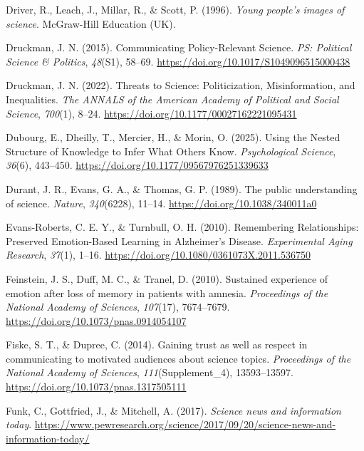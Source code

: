 \documentclass[
  man,
  floatsintext,
  longtable,
  nolmodern,
  notxfonts,
  notimes,
  colorlinks=true,linkcolor=blue,citecolor=blue,urlcolor=blue]{apa7}
\newlength{\cslhangindent}
\newenvironment{CSLReferences}[2] %
 {\begin{list}{}{%
  \setlength{\itemindent}{0pt}
  \setlength{\leftmargin}{0pt}
  \setlength{\parsep}{0pt}
  \ifodd #1
   \setlength{\leftmargin}{\cslhangindent}
   \setlength{\itemindent}{-1\cslhangindent}
  \fi
  \setlength{\itemsep}{#2\baselineskip}}}
 {\end{list}}
\begin{document}
\begin{CSLReferences}{1}{0}
Driver, R., Leach, J., Millar, R., \& Scott, P. (1996). \emph{Young
people's images of science}. McGraw-Hill Education (UK).

Druckman, J. N. (2015). Communicating Policy-Relevant Science. \emph{PS:
Political Science \& Politics}, \emph{48}(S1), 58--69.
\url{https://doi.org/10.1017/S1049096515000438}

Druckman, J. N. (2022). Threats to Science: Politicization,
Misinformation, and Inequalities. \emph{The ANNALS of the American
Academy of Political and Social Science}, \emph{700}(1), 8--24.
\url{https://doi.org/10.1177/00027162221095431}

Dubourg, E., Dheilly, T., Mercier, H., \& Morin, O. (2025). Using the
Nested Structure of Knowledge to Infer What Others Know.
\emph{Psychological Science}, \emph{36}(6), 443--450.
\url{https://doi.org/10.1177/09567976251339633}

Durant, J. R., Evans, G. A., \& Thomas, G. P. (1989). The public
understanding of science. \emph{Nature}, \emph{340}(6228), 11--14.
\url{https://doi.org/10.1038/340011a0}

Evans-Roberts, C. E. Y., \& Turnbull, O. H. (2010). Remembering
Relationships: Preserved Emotion-Based Learning in Alzheimer's Disease.
\emph{Experimental Aging Research}, \emph{37}(1), 1--16.
\url{https://doi.org/10.1080/0361073X.2011.536750}

Feinstein, J. S., Duff, M. C., \& Tranel, D. (2010). Sustained
experience of emotion after loss of memory in patients with amnesia.
\emph{Proceedings of the National Academy of Sciences}, \emph{107}(17),
7674--7679. \url{https://doi.org/10.1073/pnas.0914054107}

Fiske, S. T., \& Dupree, C. (2014). Gaining trust as well as respect in
communicating to motivated audiences about science topics.
\emph{Proceedings of the National Academy of Sciences},
\emph{111}(Supplement{\_}4), 13593--13597.
\url{https://doi.org/10.1073/pnas.1317505111}

Funk, C., Gottfried, J., \& Mitchell, A. (2017). \emph{Science news and
information today}.
\url{https://www.pewresearch.org/science/2017/09/20/science-news-and-information-today/}


\end{CSLReferences}
\end{document}

